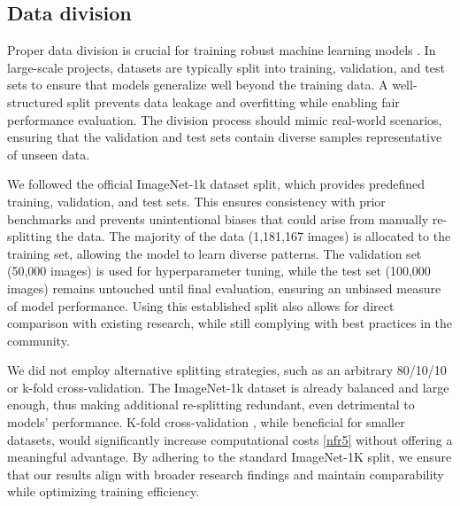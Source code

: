 \subsection{Data division}\label{sec:implementation:division}

Proper data division is crucial for training robust machine learning models \cite{Goodfellow-et-al-2016}. In large-scale projects, datasets are typically split into training, validation, and test sets to ensure that models generalize well beyond the training data. A well-structured split prevents data leakage and overfitting while enabling fair performance evaluation. The division process should mimic real-world scenarios, ensuring that the validation and test sets contain diverse samples representative of unseen data.

We followed the official ImageNet-1k dataset split, which provides predefined training, validation, and test sets. This ensures consistency with prior benchmarks and prevents unintentional biases that could arise from manually re-splitting the data. The majority of the data (1,181,167 images) is allocated to the training set, allowing the model to learn diverse patterns. The validation set (50,000 images) is used for hyperparameter tuning, while the test set (100,000 images) remains untouched until final evaluation, ensuring an unbiased measure of model performance. Using this established split also allows for direct comparison with existing research, while still complying with best practices in the community.

We did not employ alternative splitting strategies, such as an arbitrary 80/10/10 or k-fold cross-validation. The ImageNet-1k dataset is already balanced and large enough, thus making additional re-splitting redundant, even detrimental to models' performance. K-fold cross-validation \cite{luntz1969estimation}, while beneficial for smaller datasets, would significantly increase computational costs \ref{nfr5} without offering a meaningful advantage. By adhering to the standard ImageNet-1K split, we ensure that our results align with broader research findings and maintain comparability while optimizing training efficiency.



